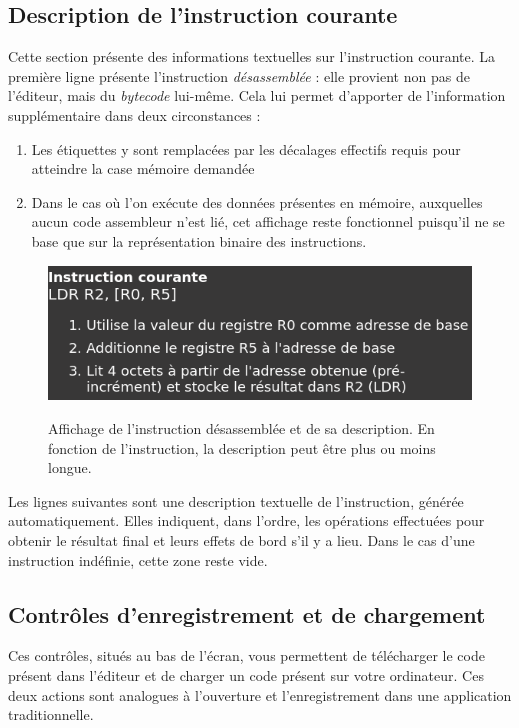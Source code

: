 \documentclass{tufte-handout}
\begin{document}
\clearpage

\subsection{Description de l'instruction courante}

Cette section présente des informations textuelles sur l'instruction courante. La première ligne présente l'instruction \emph{désassemblée} : elle provient non pas de l'éditeur, mais du \textit{bytecode} lui-même. Cela lui permet d'apporter de l'information supplémentaire dans deux circonstances :
\begin{enumerate}
	\item Les étiquettes y sont remplacées par les décalages effectifs requis pour atteindre la case mémoire demandée
	\item Dans le cas où l'on exécute des données présentes en mémoire, auxquelles aucun code assembleur n'est lié, cet affichage reste fonctionnel puisqu'il ne se base que sur la représentation binaire des instructions.
\end{enumerate}
\begin{figure}[h!]
\raggedleft
\includegraphics[width=0.6\linewidth]{pics/disassembly.png}
\label{f:disassembly}
\caption{Affichage de l'instruction désassemblée et de sa description. En fonction de l'instruction, la description peut être plus ou moins longue.}
\end{figure}

Les lignes suivantes sont une description textuelle de l'instruction, générée automatiquement. Elles indiquent, dans l'ordre, les opérations effectuées pour obtenir le résultat final et leurs effets de bord s'il y a lieu. Dans le cas d'une instruction indéfinie, cette zone reste vide.


\clearpage
\subsection{Contrôles d'enregistrement et de chargement}

Ces contrôles, situés au bas de l'écran, vous permettent de télécharger le code présent dans l'éditeur et de charger un code présent sur votre ordinateur. Ces deux actions sont analogues à l'ouverture et l'enregistrement dans une application traditionnelle.
\end{document}
